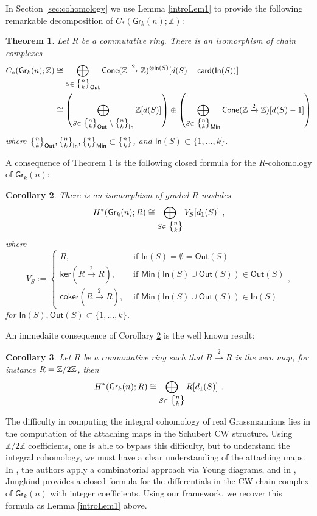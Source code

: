 \documentclass{article}
\newcommand{\bb}[1]{\mathbb{#1}}
\newcommand{\msf}[1]{\mathsf{#1}}
\newcommand{\gr}{\msf{Gr}}
\newcommand{\nchoosek}{\textstyle\genfrac{\lbrace}{\rbrace}{0pt}{}}
\newcommand{\card}{\msf{card}}
\newcommand{\cone}{\msf{Cone}}
\newcommand{\In}{\msf{In}}
\newcommand{\Out}{\msf{Out}}
\newcommand{\coker}{\msf{coker}}
\renewcommand{\ker}{\msf{ker}}
\newtheorem{theorem}{Theorem}[section]
\newtheorem{corollary}[theorem]{Corollary}
\theoremstyle{definition}
\begin{document}
In Section \ref{sec:cohomology} we use Lemma \ref{introLem1} to provide the following remarkable 
decomposition of $C_*(\gr_k(n);\bb{Z})$:
\begin{theorem}\label{introThm}
    Let $R$ be a commutative ring. There is an isomorphism of chain complexes
    \begin{align*}
        C_*(\gr_k(n);\ZZ) &\cong \bigoplus_{S \in \nchoosek{n}{k}_\Out}
            \cone(\ZZ \xrightarrow{2} \ZZ)^{\otimes \In(S)}[d(S)-\card(\In(S))] \\
        &\cong \left(\bigoplus_{S \in \nchoosek{n}{k}_\Out \setminus \nchoosek{n}{k}_\In} \ZZ[d(S)]\right) \oplus
            \left(\bigoplus_{S \in \nchoosek{n}{k}_\msf{Min}} \cone(\ZZ \xrightarrow{2}\ZZ)[d(S)-1]\right)
    \end{align*}
    where $\nchoosek{n}{k}_\Out,\nchoosek{n}{k}_\In, \nchoosek{n}{k}_\msf{Min} \subset \nchoosek{n}{k}$, and $\In(S) \subset \{1, \dots, k\}$.
\end{theorem}

A consequence of Theorem \ref{introThm} is the following closed formula for the 
$R$-cohomology of $\gr_k(n)$:
\begin{corollary}\label{introCor1}
    There is an isomorphism of graded $R$-modules
    $$H^*(\gr_k(n);R) \cong \bigoplus_{S \in \nchoosek{n}{k}} V_S[d_1(S)]~,$$
    where 
    $$V_S := \begin{cases}
                            R, &\text{ if } \msf{In}(S)  = \emptyset = \msf{Out}(S) \\
                            \ker(R\xrightarrow{2}R), &\text{ if } \msf{Min}(\In(S) \cup \Out(S)) \in \Out(S) \\
                            \coker(R\xrightarrow{2}R), &\text{ if } \msf{Min}(\In(S) \cup \Out(S)) \in \In(S)
                    \end{cases},$$
    for $\In(S), \Out(S) \subset \{1, \dots, k\}$.
\end{corollary}

An immedaite consequence of Corollary \ref{introCor1} is the well known result:
\begin{corollary}
    Let $R$ be a commutative ring such that $R\xrightarrow{2}R$ is the zero map, for instance $R=\mathbb Z/2\mathbb Z$,
    then 
    $$H^*(\gr_k(n);R) \cong \bigoplus_{S \in \nchoosek{n}{k}} R[d_1(S)]~.$$
\end{corollary}

The difficulty in computing the integral cohomology of 
real Grassmannians lies in the computation of 
the attaching maps in the Schubert CW structure. 
Using $\bb{Z}/2\bb{Z}$ coefficients, one is able to bypass this difficulty,
but to understand the integral cohomology, we must have a clear understanding of the attaching maps. 
In \cite{ck13}, the authors apply a
combinatorial approach via Young diagrams, and
in \cite{jungkind}, Jungkind provides a closed formula for the differentials in the CW chain complex of 
$\gr_k(n)$ with integer coefficients. Using our framework, we recover this formula as Lemma
\ref{introLem1} above. \\
\end{document}
